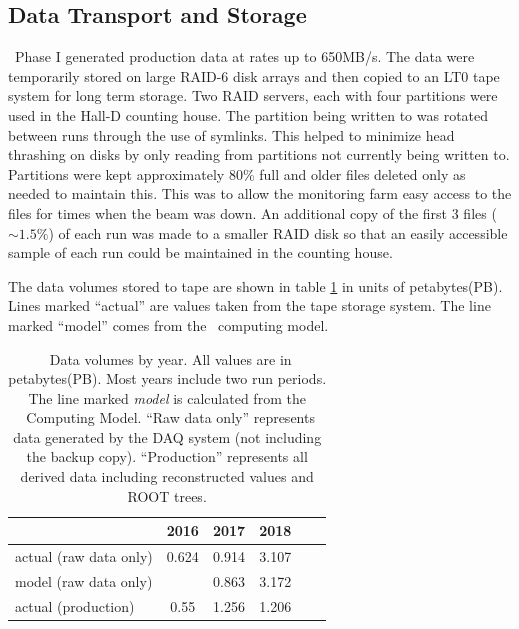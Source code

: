 \subsection{Data Transport and Storage \label{sec:onlineprocessing}}

\GX ~Phase I generated production data at rates up to 650MB/s. The data were temporarily stored on large RAID-6 disk arrays and then copied to an LT0 tape system for long term storage. Two RAID servers, each with four partitions were used in the Hall-D counting house. The partition being written to was rotated between runs through the use of symlinks. This helped to minimize head thrashing on disks by only reading from partitions not currently being written to. Partitions were kept approximately 80\% full and older files deleted only as needed to maintain this. This was to allow the monitoring farm easy access to the files for times when the beam was down. An additional copy of the first 3 files ($\sim1.5\%$) of each run was made to a smaller RAID disk so that an easily accessible sample of each run could be maintained in the counting house.

The data volumes stored to tape are shown in table \ref{tab:online_data_volumes} in units of petabytes(PB). Lines marked ``actual'' are values taken from the tape storage system. The line marked ``model'' comes from the \GX ~computing model\cite{gx3821}.

\begin{table}[]
    \centering
    \begin{tabular}{|l|c|c|c|c|c|}
    \hline
                           & \textbf{2016}  & \textbf{2017}  & \textbf{2018} \\
    \hline
    actual (raw data only) & 0.624 & 0.914 & 3.107 \\
    \hline
     model (raw data only) &       & 0.863 & 3.172 \\
    \hline
    \hline
    actual (production)    & 0.55  & 1.256 & 1.206 \\
    \hline
    \end{tabular}
    \caption{\GX ~Data volumes by year. All values are in petabytes(PB). Most years include two run periods. The line marked \textit{model} is calculated from the \GX ~Computing Model\cite{gx3821}. ``Raw data only'' represents data generated by the DAQ system (not including the backup copy). ``Production'' represents all derived data including reconstructed values and ROOT trees. }
    \label{tab:online_data_volumes}
\end{table}

